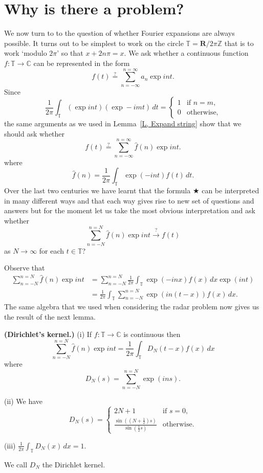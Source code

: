 \section{Why is there a problem?} We now turn to to the question
of whether Fourier expansions are always possible. It turns out
to be simplest to work on the circle
${\mathbb T}={\mathbf R}/2\pi{\mathbb Z}$ that is to work
`modulo $2\pi$' so that $x+2n\pi=x$. We ask whether a
continuous function $f:{\mathbb T}\rightarrow{\mathbb C}$
can be represented in the form
\[f(t)\overset{?}{=}\sum_{n=-\infty}^{n=\infty}a_{n}\exp int.\]
Since
\begin{equation*}
\frac{1}{2\pi}\int_{\mathbb T}(\exp int)(\exp -imt)\,dt=
\begin{cases}1&\text{if $n=m$,}\\
0&\text{otherwise,}
\end{cases}
\end{equation*}
the same arguments as we used in Lemma~\ref{L, Expand string}
show that we should ask whether
\begin{equation}
\tag*{$\bigstar$}
f(t)\overset{?}{=}\sum_{n=-\infty}^{n=\infty}\hat{f}(n)\exp int.
\end{equation}
where
\[\hat{f}(n)=
\frac{1}{2\pi}\int_{\mathbb T}\exp(-int)f(t)\,dt.\]
Over the last two centuries we have learnt that the
formula $\bigstar$ can be interpreted in many different
ways and that each way gives rise to new set of questions
and answers but for the moment let us take the most
obvious interpretation and ask whether
\[\sum_{n=-N}^{n=N}\hat{f}(n)\exp int
\overset{?}{\rightarrow}f(t)\]
as $N\rightarrow\infty$ for each $t\in{\mathbb T}$?

Observe that
\begin{align*}
\sum_{n=-N}^{n=N}\hat{f}(n)\exp int
&=\sum_{n=-N}^{n=N}
\frac{1}{2\pi}\int_{\mathbb T}\exp(-inx)f(x)\,dx\exp(int)\\
&=\frac{1}{2\pi}\int_{\mathbb T}\sum_{n=-N}^{n=N}\exp(in(t-x))f(x)\,dx.
\end{align*}
The same algebra that we used when considering the radar problem
now gives us the result of the next lemma.
\begin{lemma}{\bf (Dirichlet's kernel.)}\label{L, Dirichlet's kernel}
(i) If $f:{\mathbb T}\rightarrow{\mathbb C}$ is continuous then
\[\sum_{n=-N}^{n=N}\hat{f}(n)\exp int=
\frac{1}{2\pi}\int_{\mathbb T}D_{N}(t-x)f(x)\,dx\]
where
\[D_{N}(s)=\sum_{n=-N}^{n=N}\exp(ins).\]

(ii) We have
\begin{equation*}
D_{N}(s)=
\begin{cases}2N+1&\text{if $s=0$,}\\
\frac{\sin((N+\frac{1}{2})s)}{\sin(\frac{1}{2}s)}&\text{otherwise.}
\end{cases}
\end{equation*}

(iii) ${\displaystyle \frac{1}{2\pi}\int_{\mathbb T}D_{N}(x)\,dx=1.}$
\end{lemma}
We call $D_{N}$ the Dirichlet kernel.

